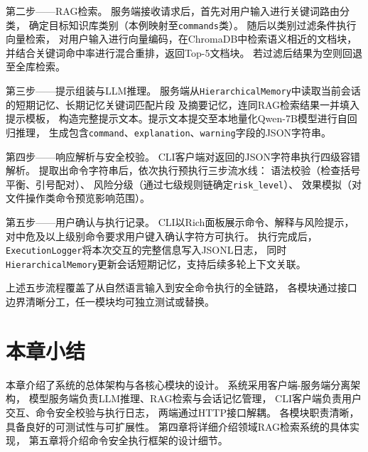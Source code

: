 第二步——RAG检索。
服务端接收请求后，首先对用户输入进行关键词路由分类，
确定目标知识库类别（本例映射至\texttt{commands}类）。
随后以类别过滤条件执行向量检索，
对用户输入进行向量编码，在ChromaDB中检索语义相近的文档块，
并结合关键词命中率进行混合重排，返回Top-5文档块。
若过滤后结果为空则回退至全库检索。

第三步——提示组装与LLM推理。
服务端从\texttt{HierarchicalMemory}中读取当前会话的短期记忆、长期记忆关键词匹配片段
及摘要记忆，连同RAG检索结果一并填入提示模板，
构造完整提示文本。提示文本提交至本地量化Qwen-7B模型进行自回归推理，
生成包含\texttt{command}、\texttt{explanation}、\texttt{warning}字段的JSON字符串。

第四步——响应解析与安全校验。
CLI客户端对返回的JSON字符串执行四级容错解析。
提取出命令字符串后，依次执行预执行三步流水线：
语法校验（检查括号平衡、引号配对）、
风险分级（通过七级规则链确定\texttt{risk\_level}）、
效果模拟（对文件操作类命令预览影响范围）。

第五步——用户确认与执行记录。
CLI以Rich面板展示命令、解释与风险提示，
对中危及以上级别命令要求用户键入确认字符方可执行。
执行完成后，\texttt{ExecutionLogger}将本次交互的完整信息写入JSONL日志，
同时\texttt{HierarchicalMemory}更新会话短期记忆，支持后续多轮上下文关联。

上述五步流程覆盖了从自然语言输入到安全命令执行的全链路，
各模块通过接口边界清晰分工，任一模块均可独立测试或替换。

\section{本章小结}

本章介绍了系统的总体架构与各核心模块的设计。
系统采用客户端-服务端分离架构，
模型服务端负责LLM推理、RAG检索与会话记忆管理，
CLI客户端负责用户交互、命令安全校验与执行日志，
两端通过HTTP接口解耦。
各模块职责清晰，具备良好的可测试性与可扩展性。
第四章将详细介绍领域RAG检索系统的具体实现，
第五章将介绍命令安全执行框架的设计细节。

